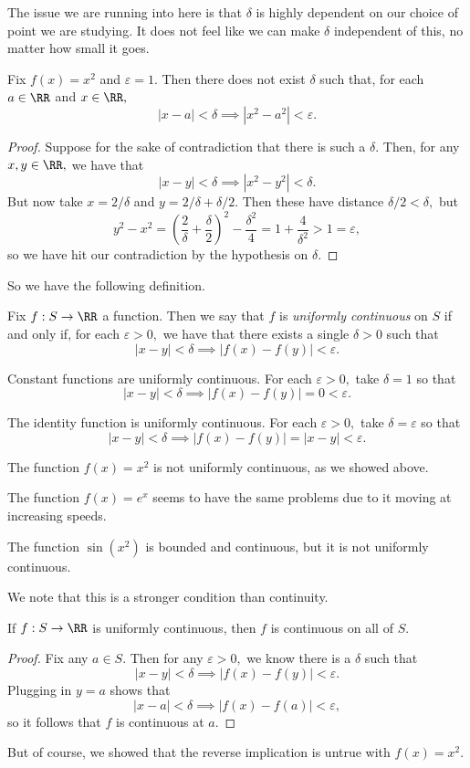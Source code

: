 The issue we are running into here is that $\delta$ is highly dependent on our choice of point we are studying. It does not feel like we can make $\delta$ independent of this, no matter how small it goes.
\begin{proposition}
	Fix $f(x)=x^2$ and $\varepsilon=1.$ Then there does not exist $\delta$ such that, for each $a\in\RR$ and $x\in\RR,$
	\[|x-a|<\delta\implies\left|x^2-a^2\right|<\varepsilon.\]
\end{proposition}
\begin{proof}
	Suppose for the sake of contradiction that there is such a $\delta.$ Then, for any $x,y\in\RR,$ we have that
	\[|x-y|<\delta\implies\left|x^2-y^2\right|<\delta.\]
	But now take $x=2/\delta$ and $y=2/\delta+\delta/2.$ Then these have distance $\delta/2<\delta,$ but
	\[y^2-x^2=\left(\frac2\delta+\frac\delta2\right)^2-\frac{\delta^2}4=1+\frac4{\delta^2}>1=\varepsilon,\]
	so we have hit our contradiction by the hypothesis on $\delta.$
\end{proof}
So we have the following definition.
\begin{definition}
	Fix $f:S\to\RR$ a function. Then we say that $f$ is \textit{uniformly continuous} on $S$ if and only if, for each $\varepsilon>0,$ we have that there exists a single $\delta>0$ such that
	\[|x-y|<\delta\implies|f(x)-f(y)|<\varepsilon.\]
\end{definition}
\begin{example}
	Constant functions are uniformly continuous. For each $\varepsilon>0,$ take $\delta=1$ so that
	\[|x-y|<\delta\implies|f(x)-f(y)|=0<\varepsilon.\]
\end{example}
\begin{example}
	The identity function is uniformly continuous. For each $\varepsilon>0,$ take $\delta=\varepsilon$ so that
	\[|x-y|<\delta\implies|f(x)-f(y)|=|x-y|<\varepsilon.\]
\end{example}
\begin{nex}
	The function $f(x)=x^2$ is not uniformly continuous, as we showed above.
\end{nex}
\begin{example}
	The function $f(x)=e^x$ seems to have the same problems due to it moving at increasing speeds.
\end{example}
\begin{nex}
	The function $\sin\left(x^2\right)$ is bounded and continuous, but it is not uniformly continuous.
\end{nex}
We note that this is a stronger condition than continuity.
\begin{prop}
	If $f:S\to\RR$ is uniformly continuous, then $f$ is continuous on all of $S.$
\end{prop}
\begin{proof}
	Fix any $a\in S.$ Then for any $\varepsilon>0,$ we know there is a $\delta$ such that
	\[|x-y|<\delta\implies|f(x)-f(y)|<\varepsilon.\]
	Plugging in $y=a$ shows that
	\[|x-a|<\delta\implies|f(x)-f(a)|<\varepsilon,\]
	so it follows that $f$ is continuous at $a.$
\end{proof}
But of course, we showed that the reverse implication is untrue with $f(x)=x^2.$

